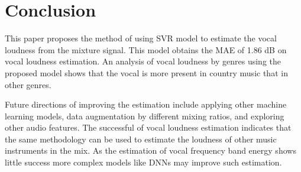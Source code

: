 \documentclass[conference]{IEEEtran}
\begin{document}
\section{Conclusion}
This paper proposes the method of using SVR model to estimate the vocal loudness from the mixture signal. This model obtains the MAE of 1.86 dB on vocal loudness estimation. An analysis of vocal loudness by genres using the proposed model shows that the vocal is more present in country music that in other genres.

Future directions of improving the estimation include applying other machine learning models, data augmentation by different mixing ratios, and exploring other audio features. The successful of vocal loudness estimation indicates that the same methodology can be used to estimate the loudness of other music instruments in the mix. As the estimation of vocal frequency band energy shows little success more complex models like DNNs may improve such estimation.







\end{document}
